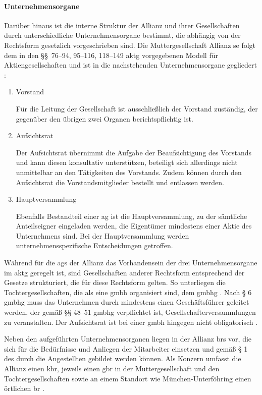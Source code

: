 \paragraph{Unternehmensorgane}
Darüber hinaus ist die interne Struktur der Allianz und ihrer Gesellschaften durch unterschiedliche Unternehmensorgane bestimmt, die abhängig
von der Rechtsform gesetzlich vorgeschrieben sind. Die Muttergesellschaft Allianz \gls{se} folgt dem in den §§~76--94, 95--116, 118--149
\gls{aktg} vorgegebenen Modell für Aktiengesellschaften \cite{aktg} und ist in die nachstehenden Unternehmensorgane gegliedert
\cite{allianzOrgane}: %
\begin{enumerate}
    \item Vorstand
    
    Für die Leitung der Gesellschaft ist ausschließlich der Vorstand zuständig, der gegenüber den übrigen zwei Organen berichtspflichtig ist.
    \item Aufsichtsrat
    
    Der Aufsichtsrat übernimmt die Aufgabe der Beaufsichtigung des Vorstands und kann diesen konsultativ unterstützen, beteiligt sich allerdings
    nicht unmittelbar an den Tätigkeiten des Vorstands. Zudem können durch den Aufsichtsrat die Vorstandsmitglieder bestellt und entlassen werden.
    \item Hauptversammlung
    
    Ebenfalls Bestandteil einer \gls{ag} ist die Hauptversammlung, zu der sämtliche Anteilseigner eingeladen werden, die Eigentümer mindestens
    einer Aktie des Unternehmens sind. Bei der Hauptversammlung werden unternehmensspezifische Entscheidungen getroffen.
\end{enumerate}

Während für die \glspl{ag} der Allianz das Vorhandensein der drei Unternehmensorgane im \gls{aktg} geregelt ist, sind Gesellschaften
anderer Rechtsform entsprechend der Gesetze strukturiert, die für diese Rechtsform gelten. So unterliegen die Tochtergesellschaften, die als eine
\gls{gmbh} organisiert sind, dem \gls{gmbhg} \cite{GmbHG}. Nach § 6 \gls{gmbhg} muss das Unternehmen durch mindestens einen Geschäftsführer
geleitet werden, der gemäß §§ 48--51 \gls{gmbhg} verpflichtet ist, Gesellschafterversammlungen zu veranstalten. Der Aufsichtsrat ist bei einer
\gls{gmbh} hingegen nicht obligatorisch \cite[§ 52]{GmbHG}.

Neben den aufgeführten Unternehmensorganen liegen in der Allianz \glspl{br} vor, die sich für die Bedürfnisse und Anliegen der Mitarbeiter einsetzen
und gemäß § 1 des  \cite{BetrVG} durch die Angestellten gebildet werden können. Als Konzern
umfasst die Allianz einen \gls{kbr}, jeweils einen \gls{gbr} in der Muttergesellschaft und den Tochtergesellschaften sowie an einem Standort wie
München-Unterföhring einen örtlichen \gls{br} \cite{betriebsräteAllianz}.

